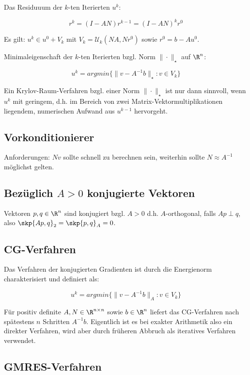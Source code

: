 Das Residuuum der $k$-ten Iterierten $u^k$:

\vspace{-2mm}
$$r^k=(I-AN)r^{k-1} = (I-AN)^kr^0$$

Es gilt: $u^k \in u^0 + V_k$ mit $V_k = \mathcal{U}_k(NA,Nr^0)$ sowie $r^0 = b - Au^0$.

Minimaleigenschaft der $k$-ten Iterierten bzgl. Norm $\|\cdot\|_\star$ auf $\R^n$:

\vspace{-2mm}
$$u^k = argmin\{\|v - A^{-1}b\|_\star : v \in V_k\}$$

Ein Krylov-Raum-Verfahren bzgl. einer Norm $\|\cdot\|_\star$ ist nur dann sinnvoll, wenn $u^k$ mit geringem, d.h. im Bereich von zwei Matrix-Vektormultiplikationen liegendem, numerischen Aufwand aus $u^{k-1}$ hervorgeht.

\subsection*{Vorkonditionierer}

Anforderungen: $Nv$ sollte schnell zu berechnen sein, weiterhin sollte $N \approx A^{-1}$ möglichst gelten.

\subsection*{Bezüglich $A > 0$ konjugierte Vektoren}

Vektoren $p, q \in \R^n$ sind konjugiert bzgl. $A > 0$ d.h. $A$-orthogonal, falls $Ap \perp q$, also $\skp{Ap,q}_2=\skp{p,q}_A=0$.

\subsection*{CG-Verfahren}

Das Verfahren der konjugierten Gradienten ist durch die Energienorm charakterisiert und definiert als:

\vspace{-2mm}
$$u^k = argmin\{\|v-A^{-1}b\|_A : v \in V_k\}$$

Für positiv definite $A, N \in \R^{n \times n}$ sowie $b \in \R^n$ liefert das CG-Verfahren nach spätestens $n$ Schritten $A^{-1}b$. Eigentlich ist es bei exakter Arithmetik also ein direkter Verfahren, wird aber durch früheren Abbruch als iteratives Verfahren verwendet.

\subsection*{GMRES-Verfahren}

